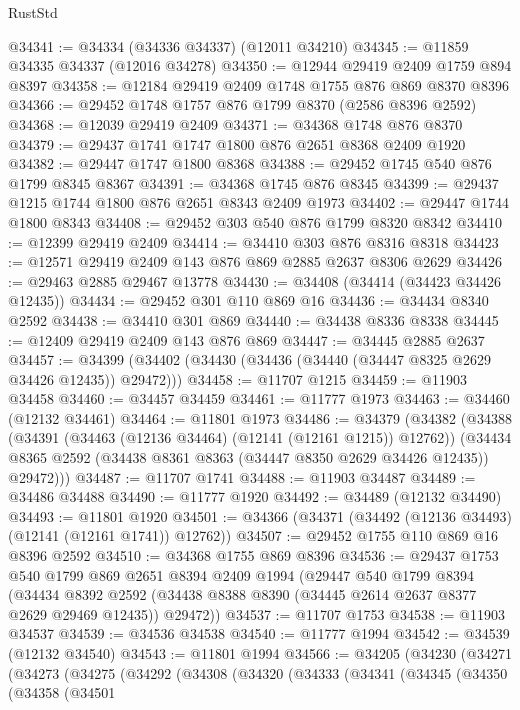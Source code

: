 \begin{lexlean}{RustStd}
\begin{coremodule}
@34341 := @34334 (@34336 @34337) (@12011 @34210)
@34345 := @11859 @34335 @34337 (@12016 @34278)
@34350 := @12944 @29419 @2409 @1759 @894 @8397
@34358 := @12184 @29419 @2409 @1748 @1755 @876 @869 @8370 @8396
@34366 := @29452 @1748 @1757 @876 @1799 @8370 (@2586 @8396 @2592)
@34368 := @12039 @29419 @2409
@34371 := @34368 @1748 @876 @8370
@34379 := @29437 @1741 @1747 @1800 @876 @2651 @8368 @2409 @1920
@34382 := @29447 @1747 @1800 @8368
@34388 := @29452 @1745 @540 @876 @1799 @8345 @8367
@34391 := @34368 @1745 @876 @8345
@34399 := @29437 @1215 @1744 @1800 @876 @2651 @8343 @2409 @1973
@34402 := @29447 @1744 @1800 @8343
@34408 := @29452 @303 @540 @876 @1799 @8320 @8342
@34410 := @12399 @29419 @2409
@34414 := @34410 @303 @876 @8316 @8318
@34423 := @12571 @29419 @2409 @143 @876 @869 @2885 @2637 @8306 @2629
@34426 := @29463 @2885 @29467 @13778
@34430 := @34408 (@34414 (@34423 @34426 @12435))
@34434 := @29452 @301 @110 @869 @16
@34436 := @34434 @8340 @2592
@34438 := @34410 @301 @869
@34440 := @34438 @8336 @8338
@34445 := @12409 @29419 @2409 @143 @876 @869
@34447 := @34445 @2885 @2637
@34457 := @34399 (@34402 (@34430 (@34436 (@34440 (@34447 @8325 @2629 @34426 @12435)) @29472)))
@34458 := @11707 @1215
@34459 := @11903 @34458
@34460 := @34457 @34459
@34461 := @11777 @1973
@34463 := @34460 (@12132 @34461)
@34464 := @11801 @1973
@34486 := @34379
    (@34382
      (@34388
        (@34391 (@34463 (@12136 @34464) (@12141 (@12161 @1215)) @12762))
        (@34434 @8365 @2592 (@34438 @8361 @8363 (@34447 @8350 @2629 @34426 @12435)) @29472)))
@34487 := @11707 @1741
@34488 := @11903 @34487
@34489 := @34486 @34488
@34490 := @11777 @1920
@34492 := @34489 (@12132 @34490)
@34493 := @11801 @1920
@34501 := @34366 (@34371 (@34492 (@12136 @34493) (@12141 (@12161 @1741)) @12762))
@34507 := @29452 @1755 @110 @869 @16 @8396 @2592
@34510 := @34368 @1755 @869 @8396
@34536 := @29437
    @1753
    @540
    @1799
    @869
    @2651
    @8394
    @2409
    @1994
    (@29447
      @540
      @1799
      @8394
      (@34434
        @8392
        @2592
        (@34438 @8388 @8390 (@34445 @2614 @2637 @8377 @2629 @29469 @12435))
        @29472))
@34537 := @11707 @1753
@34538 := @11903 @34537
@34539 := @34536 @34538
@34540 := @11777 @1994
@34542 := @34539 (@12132 @34540)
@34543 := @11801 @1994
@34566 := @34205
    (@34230
      (@34271
        (@34273
          (@34275
            (@34292
              (@34308
                (@34320
                  (@34333
                    (@34341
                      (@34345
                        (@34350
                          (@34358
                            (@34501

\end{coremodule}
\end{lexlean}
